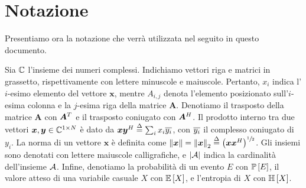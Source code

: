 \section{Notazione}

Presentiamo ora la notazione che verrà utilizzata nel seguito in questo
documento.

Sia \(\mathbb{C}\) l'insieme dei numeri complessi. Indichiamo vettori riga e matrici in
grassetto, rispettivamente con lettere minuscole e maiuscole.  Pertanto,
\(x_i\) indica l'\(i\)-esimo elemento del vettore \(\bm{x}\), mentre
\(A_{i,j}\) denota l'elemento posizionato sull'\(i\)-esima colonna e la
\(j\)-esima riga della matrice \(\bm{A}\). Denotiamo il trasposto della matrice
\(\bm{A}\) con \(\bm{A}^{T}\) e il trasposto coniugato con \(\bm{A}^{H}\).  Il
prodotto interno tra due vettori \(\bm{x},\bm{y} \in \mathbb{C}^{1 \times N}\) è dato
da \(\bm{x}\bm{y}^{H} \overset{\Delta}{=} \sum_i x_i \overline{y_i}\), con \(\overline{y_i}\) il
complesso coniugato di \(y_i\). La norma di un vettore \(\bm{x}\) è definita
come \(\left\| \bm{x} \right\| = \left\| \bm{x} \right\|_2 \overset{\Delta}{=}
\left(\bm{x}\bm{x}^{H}\right)^{\sfrac{1}{2}}\). Gli insiemi sono denotati con
lettere maiuscole calligrafiche, e \(\left| \mathcal{A} \right|\) indica la cardinalità
dell'insieme \(\mathcal{A}\). Infine, denotiamo la probabilità di un evento \(E\)
con \(\mathbb{P}\left[ E \right]\), il valore atteso di una variabile casuale \(X\) con
\(\mathbb{E}\left[ X \right]\), e l'entropia di \(X\) con \(\mathbb{H}\left[ X \right]\).
